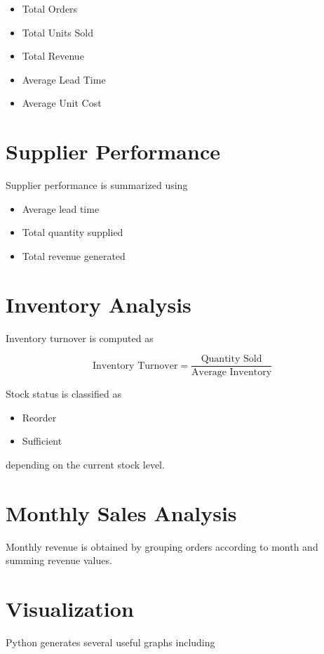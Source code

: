 \documentclass[11pt,a4paper]{article}
\begin{document}
\begin{itemize}
\item Total Orders
\item Total Units Sold
\item Total Revenue
\item Average Lead Time
\item Average Unit Cost
\end{itemize}

\section{Supplier Performance}

Supplier performance is summarized using

\begin{itemize}
\item Average lead time
\item Total quantity supplied
\item Total revenue generated
\end{itemize}

\section{Inventory Analysis}

Inventory turnover is computed as

\[
\text{Inventory Turnover}
=
\frac{\text{Quantity Sold}}
{\text{Average Inventory}}
\]

Stock status is classified as

\begin{itemize}
\item Reorder
\item Sufficient
\end{itemize}

depending on the current stock level.

\section{Monthly Sales Analysis}

Monthly revenue is obtained by grouping orders according to month and summing revenue values.

\section{Visualization}

Python generates several useful graphs including
\end{document}
